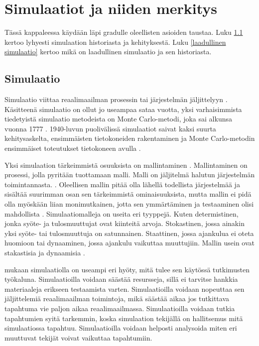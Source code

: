 \documentclass[utf8]{gradu3}
\begin{document}
\chapter{Simulaatiot ja niiden merkitys}
Tässä kappaleessa käydään läpi gradulle oleellisten asioiden taustaa. Luku \ref{simulaatio} kertoo lyhyesti simulaation historiasta ja kehityksestä. Luku \ref{laadullinen simulaatio} kertoo mikä on laadullinen simulaatio ja sen historiasta.

\section{Simulaatio} \label{simulaatio}
Simulaatio viittaa reaalimaailman prosessin tai järjestelmän jäljittelyyn \parencite{banks1999introduction}. Käsitteenä simulaatio on ollut jo useampaa sataa vuotta, yksi varhaisimmista tiedetyistä simulaatio metodeista on Monte Carlo-metodi, joka sai alkunsa vuonna 1777 \parencite{HistoryOfSimulation}. 1940-luvun puolivälissä simulaatiot saivat kaksi suurta kehitysaskelta, ensimmäisten tietokoneiden rakentaminen ja Monte Carlo-metodin ensimmäiset toteutukset tietokoneen avulla \parencite{HistoryOfSimulation}. 

Yksi simulaation tärkeimmistä osuuksista on mallintaminen \parencite{HistoryOfSimulation}. Mallintaminen on prosessi, jolla pyritään tuottamaan malli. Malli on jäljitelmä halutun järjestelmän toimintannasta. \parencite{maria1997introduction}. Oleellisen mallin pitää olla lähellä todellista järjestelmää ja sisältää suurimman osan sen tärkeimmistä ominaisuuksista, mutta mallin ei pidä olla myöskään liian monimutkainen, jotta sen ymmärtäminen ja testaaminen olisi mahdollista \parencite{maria1997introduction}. Simulaatiomalleja on useita eri tyyppejä. Kuten determistinen, jonka syöte- ja tulosmuuttujat ovat kiinteitä arvoja. Stokastinen, jossa ainakin yksi syöte- tai tulosmuuttuja on satunnainen. Staattinen, jossa ajankulua ei oteta huomioon tai dynaaminen, jossa ajankulu vaikuttaa muuttujiin. Mallin usein ovat stakastisia ja dynaamisia \parencite{maria1997introduction}.

\cite{banks1999introduction} mukaan simulaatiolla on useampi eri hyöty, mitä tulee sen käytössä tutkimusten työkaluna. Simulaatioilla voidaan säästää resursseja, sillä ei tarvitse hankkia materiaaleja erikseen testaamista varten. Simulaatioilla voidaan nopeuttaa sen jäljittelemiä reaalimaailman toimintoja, mikä säästää aikaa jos tutkittava tapahtuma vie paljon aikaa reaalimaailmassa. Simulaatioilla voidaan tutkia tapahtumien syitä tarkemmin, koska simulaation tekijällä on hallitsemus mitä simulaatiossa tapahtuu. Simulaatioilla voidaan helposti analysoida miten eri muuttuvat tekijät voivat vaikuttaa tapahtumiin.
\end{document}

